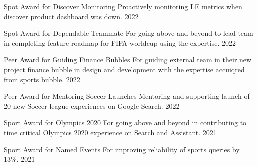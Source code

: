 




\begin{cvhonors}


\cvhonor
{Spot Award for Discover Monitoring} %
{Proactively monitoring LE metrics when discover product dashboard was down.} %
{} %
{2022} %


\cvhonor
{Spot Award for Dependable Teammate} %
{For going above and beyond to lead team in completing feature roadmap for FIFA worldcup using the expertise.} %
{} %
{2022} %


\cvhonor
{Peer Award for Guiding Finance Bubbles} %
{For guiding external team in their new project finance bubble in design and development with the expertise accuiqred from sports bubble.} %
{} %
{2022} %


\cvhonor
{Peer Award for Mentoring Soccer Launches} %
{Mentoring and supporting launch of 20 new Soccer league experiences on Google Search.} %
{} %
{2022} %


\cvhonor
{Sport Award for Olympics 2020} %
{For going above and beyond in contributing to time critical Olympics 2020 experience on Search and Assistant.} %
{} %
{2021} %


\cvhonor
{Sport Award for Named Events} %
{For improving reliability of sports queries by 13\%.} %
{} %
{2021} %


\end{cvhonors}
